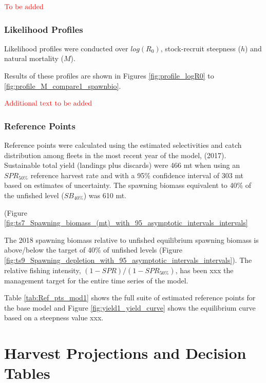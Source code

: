 \documentclass[12pt,]{article}
\begin{document}
\textbf{\(\color{red}{\text{To be added}}\)}

\hypertarget{likelihood-profiles}{%
\subsubsection{Likelihood Profiles}\label{likelihood-profiles}}

Likelihood profiles were conducted over \(log(R_0)\), stock-recruit
steepness (\(h\)) and natural mortality (\(M\)).

Results of these profiles are shown in Figures \ref{fig:profile_logR0}
to \ref{fig:profile_M_compare1_spawnbio}.

\textbf{\(\color{red}{\text{Additional text to be added}}\)}

\hypertarget{reference-points-1}{%
\subsubsection{Reference Points}\label{reference-points-1}}

Reference points were calculated using the estimated selectivities and
catch distribution among fleets in the most recent year of the model,
(2017). Sustainable total yield (landings plus discards) were 466 mt
when using an \(SPR_{50\%}\) reference harvest rate and with a 95\%
confidence interval of 303 mt based on estimates of uncertainty. The
spawning biomass equivalent to 40\% of the unfished level
(\(SB_{40\%}\)) was 610 mt.

(Figure
\ref{fig:ts7_Spawning_biomass_(mt)_with_95_asymptotic_intervals_intervals}

The 2018 spawning biomass relative to unfished equilibrium spawning
biomass is above/below the target of 40\% of unfished levels (Figure
\ref{fig:ts9_Spawning_depletion_with_95_asymptotic_intervals_intervals}).
The relative fishing intensity, \((1-SPR)/(1-SPR_{50\%})\), has been xxx
the management target for the entire time series of the model.

Table \ref{tab:Ref_pts_mod1} shows the full suite of estimated reference
points for the base model and Figure \ref{fig:yield1_yield_curve} shows
the equilibrium curve based on a steepness value xxx.

\newpage

\hypertarget{harvest-projections-and-decision-tables}{%
\section{Harvest Projections and Decision
Tables}\label{harvest-projections-and-decision-tables}}
\end{document}
